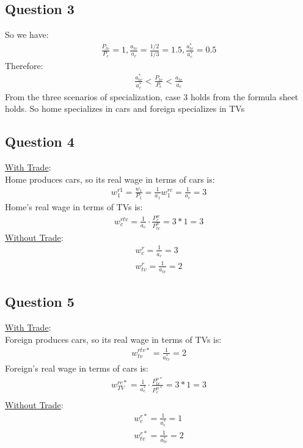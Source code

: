 \documentclass{article}
\begin{document}
\par \vspace{0.8em}
\subsection{Question 3}

So we have:
\begin{gather*}
  \frac{P_{tv}}{P_{c}} = 1, \frac{a_{tv}}{a_{c}} = \frac{1/2}{1/3} = 1.5, \frac{a_{tv}^{*}}{a_{c}^{*}} = 0.5
\end{gather*}
Therefore:
\begin{gather*}
  \frac{a_{tv}^{*}}{a_{c}^{*}} < \frac{P_{tv}}{P_{c}} < \frac{a_{tv}}{a_{c}}
\end{gather*}
From the three scenarios of specialization, case 3 holds from the formula sheet holds. So home specializes in cars and foreign specializes in TVs

\par \vspace{0.8em}
\subsection{Question 4}

\underline{With Trade}: \\
Home produces cars, so its real wage in terms of cars is:
\begin{gather*}
  w_{1}^{r1} = \frac{w_{1}}{P_{1}} = \frac{1}{a_{1}}
  w^{rc}_{1} = \frac{1}{a_{c}} = 3
\end{gather*}
Home's real wage in terms of TVs is:
\begin{gather*}
  w_{c}^{rtv} = \frac{1}{a_{c}} \cdot \frac{P_{c}^{w}}{P_{tv}^{w}} = 3*1 = 3
\end{gather*}
\underline{Without Trade}:
\begin{gather*}
  w_{c}^{r} = \frac{1}{a_{c}} = 3 \\
  w_{tv}^{r} = \frac{1}{a_{tv}} = 2
\end{gather*}

\par \vspace{0.8em}
\subsection{Question 5}

\underline{With Trade}: \\
Foreign produces cars, so its real wage in terms of TVs is:
\begin{gather*}
  w^{rtv*}_{tv} = \frac{1}{a_{tv}^{*}} = 2
\end{gather*}
Foreign's real wage in terms of cars is:
\begin{gather*}
  w_{TV}^{rc*} = \frac{1}{a_{c}^{*}} \cdot \frac{P_{tv}^{w*}}{P_{c}^{w*}} = 3*1 = 3 \\
\end{gather*}
\underline{Without Trade}:
\begin{gather*}
  w_{c}^{r*} = \frac{1}{a_{c}^{*}} = 1 \\
  w_{tv}^{r*} = \frac{1}{a_{tv}^{*}} = 2
\end{gather*}
\end{document}
